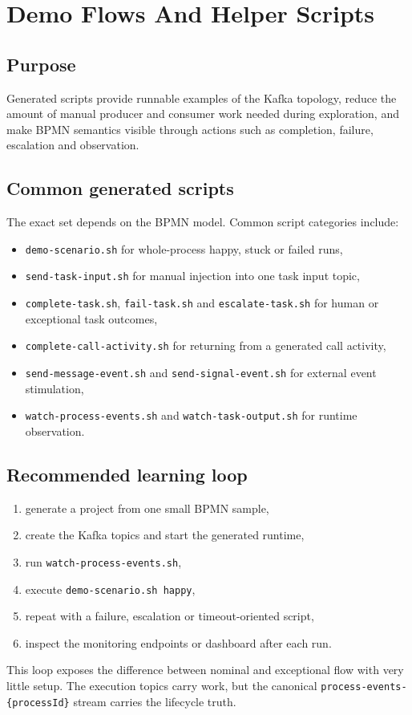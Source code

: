 \section{Demo Flows And Helper Scripts}
\label{sec:DemoFlows}

\subsection{Purpose}

Generated scripts provide runnable examples of the Kafka topology, reduce the amount of
manual producer and consumer work needed during exploration, and make BPMN semantics visible
through actions such as completion, failure, escalation and observation.

\subsection{Common generated scripts}

The exact set depends on the BPMN model. Common script categories include:
\begin{itemize}
\item \texttt{demo-scenario.sh} for whole-process happy, stuck or failed runs,
\item \texttt{send-task-input.sh} for manual injection into one task input topic,
\item \texttt{complete-task.sh}, \texttt{fail-task.sh} and \texttt{escalate-task.sh} for human or exceptional task outcomes,
\item \texttt{complete-call-activity.sh} for returning from a generated call activity,
\item \texttt{send-message-event.sh} and \texttt{send-signal-event.sh} for external event stimulation,
\item \texttt{watch-process-events.sh} and \texttt{watch-task-output.sh} for runtime observation.
\end{itemize}

\subsection{Recommended learning loop}

\begin{enumerate}
\item generate a project from one small BPMN sample,
\item create the Kafka topics and start the generated runtime,
\item run \texttt{watch-process-events.sh},
\item execute \texttt{demo-scenario.sh happy},
\item repeat with a failure, escalation or timeout-oriented script,
\item inspect the monitoring endpoints or dashboard after each run.
\end{enumerate}

This loop exposes the difference between nominal and exceptional flow with very little
setup. The execution topics carry work, but the canonical \texttt{process-events-\{processId\}} stream
carries the lifecycle truth.
